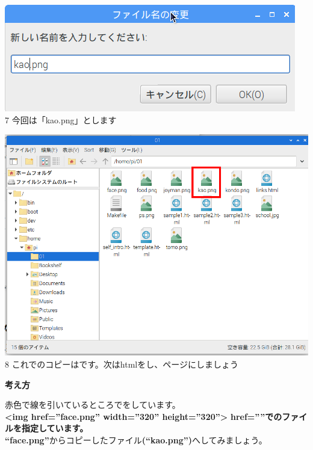 \begin{minipage}{0.45\linewidth}
  \includegraphics[width=\linewidth]{text01-img/textbook-img166.png}\\
  7 今回は「kao.png」とします
\end{minipage}
\hfill
\vspace{20pt}
\begin{minipage}{0.45\linewidth}
  \includegraphics[width=\linewidth]{text01-img/textbook-img170.png}\\
  8 これでのコピーはです。次はhtmlをし、ページにしましょう
\end{minipage}

\clearpage


\flushleft
\textbf{考え方}\ \


赤色で線を引いているところでをしています。\\
\textbf{{\textless}img href=”face.png” width=”320” height=”320”{\textgreater}}
\textbf{href=””でのファイルを指定しています。}\\
\textbf{“face.png”}からコピーしたファイル\textbf{(“kao.png”)}へしてみましょう。

